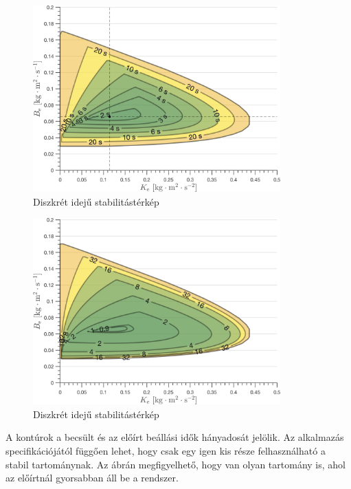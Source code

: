\begin{figure}[p]
	\begin{center}
		\includegraphics[width=0.85\textwidth]{images/time_delay_stab_map_discrete.png}
		\caption{Diszkrét idejű stabilitástérkép}\label{fig:time_delay_stab_map_discrete}
	\end{center}
\end{figure}
\begin{figure}[p]
    \begin{center}
    \includegraphics[width=0.85\textwidth]{images/time_delay_stab_map_discrete_diff.png}
    \caption{Diszkrét idejű stabilitástérkép}\label{fig:time_delay_stab_map_discrete_diff}
    \end{center}
\end{figure}

A kontúrok a becsült és az előírt beállási idők hányadosát jelölik. Az alkalmazás specifikációjától függően lehet, 
hogy csak egy igen kis része felhasználható a stabil tartománynak. Az ábrán megfigyelhető, hogy van olyan tartomány is, 
ahol az előírtnál gyorsabban áll be a rendszer.

